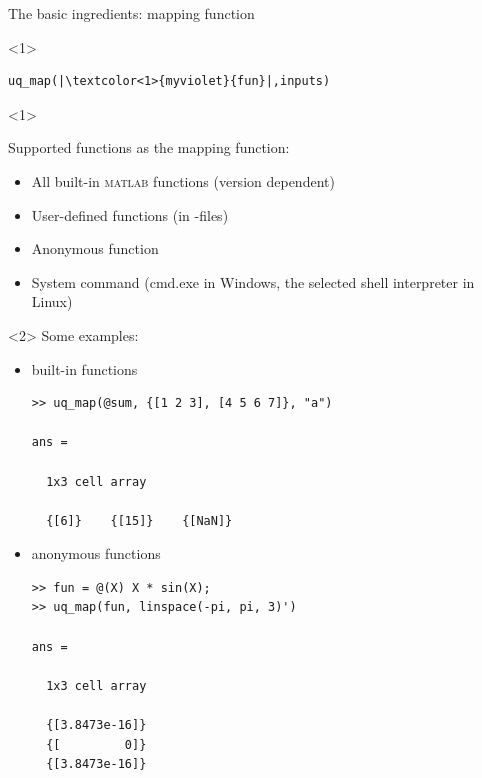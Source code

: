\documentclass[]{rsuqbeamernew}
\begin{document}
\begin{frame}[fragile]{The basic ingredients: mapping function}

\begin{onlyenv}<1>
\begin{lstlisting}[basicstyle=\large,numbers=none]
uq_map(|\textcolor<1>{myviolet}{fun}|,inputs)
\end{lstlisting}
\end{onlyenv}

\begin{onlyenv}<1>
\begin{block}{Supported functions as the mapping function:}
\begin{itemize}
  \item All built-in \textsc{matlab} functions (version dependent)
  \item User-defined functions (in -files)
  \item Anonymous function
  \item System command (cmd.exe in Windows, the selected shell interpreter in Linux)
\end{itemize}
\end{block}
\end{onlyenv}

\begin{onlyenv}<2>
Some examples:
\begin{itemize}
  \item built-in functions
  \begin{lstlisting}[numbers=none]
>> uq_map(@sum, {[1 2 3], [4 5 6 7]}, "a")

ans =

  1x3 cell array

  {[6]}    {[15]}    {[NaN]}
\end{lstlisting}

\item anonymous functions
\begin{lstlisting}[numbers=none]
>> fun = @(X) X * sin(X);
>> uq_map(fun, linspace(-pi, pi, 3)')

ans =

  1x3 cell array

  {[3.8473e-16]}
  {[         0]}
  {[3.8473e-16]}
\end{lstlisting}

\end{itemize}
\end{onlyenv}

\end{frame}
\end{document}
